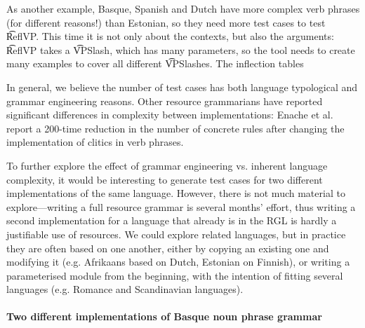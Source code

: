 
As another example, Basque, Spanish and Dutch have more complex verb
phrases (for different reasons!) than Estonian, so they need more test
cases to test \t{ReflVP}. This time it is not only about the contexts,
but also the arguments: \t{ReflVP} takes a \t{VPSlash}, which has many
parameters, so the tool needs to create many examples to cover all
different \t{VPSlash}es. The inflection tables 

In general, we believe the number of test cases has both language
typological and grammar engineering reasons. Other resource
grammarians have reported significant differences in complexity
between implementations: Enache et al. \cite{enache2010} report a
200-time reduction in the number of concrete rules after changing the
implementation of clitics in verb phrases.

To further explore the effect of grammar engineering vs. inherent
language complexity, it would be interesting to generate test cases
for two different implementations of the same language.  However,
there is not much material to explore---writing a full resource
grammar is several months' effort, thus writing a second
implementation for a language that already is in the RGL is hardly a
justifiable use of resources. We could explore related languages, but in
practice they are often based on one another, either by copying an
existing one and modifying it (e.g. Afrikaans based on Dutch, Estonian
on Finnish), or writing a parameterised module from the beginning,
with the intention of fitting several languages (e.g. Romance and
Scandinavian languages). 


\paragraph{Two different implementations of Basque noun phrase grammar}

